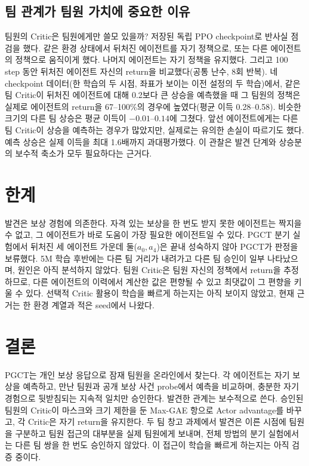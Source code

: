 \documentclass[10pt,twocolumn,letterpaper]{article}
\begin{document}
\subsection{팀 관계가 팀원 가치에 중요한 이유}
팀원의 Critic은 팀원에게만 쓸모 있을까? 저장된 독립 PPO checkpoint로 반사실 점검을 했다. 같은 환경 상태에서 뒤처진 에이전트를 자기 정책으로, 또는 다른 에이전트의 정책으로 움직이게 했다. 나머지 에이전트는 자기 정책을 유지했다. 그리고 100 step 동안 뒤처진 에이전트 자신의 return을 비교했다(공통 난수, 8회 반복). 네 checkpoint 데이터(한 학습의 두 시점, 좌표가 보이는 이전 설정의 두 학습)에서, 같은 팀 Critic이 뒤처진 에이전트에 대해 0.2보다 큰 상승을 예측했을 때 그 팀원의 정책은 실제로 에이전트의 return을 67--100\%의 경우에 높였다(평균 이득 0.28--0.58). 비슷한 크기의 다른 팀 상승은 평균 이득이 $-0.01$--$0.14$에 그쳤다. 앞선 에이전트에게는 다른 팀 Critic이 상승을 예측하는 경우가 많았지만, 실제로는 유의한 손실이 따르기도 했다. 예측 상승은 실제 이득을 최대 1.6배까지 과대평가했다. 이 관찰은 발견 단계와 상승분의 보수적 축소가 모두 필요하다는 근거다.

\section{한계}
발견은 보상 경험에 의존한다. 자격 있는 보상을 한 번도 받지 못한 에이전트는 짝지을 수 없고, 그 에이전트가 바로 도움이 가장 필요한 에이전트일 수 있다. PGCT 분기 실험에서 뒤처진 세 에이전트 가운데 둘($a_0,a_4$)은 끝내 성숙하지 않아 PGCT가 판정을 보류했다. 5M 학습 후반에는 다른 팀 거리가 내려가고 다른 팀 승인이 일부 나타났으며, 원인은 아직 분석하지 않았다. 팀원 Critic은 팀원 자신의 정책에서 return을 추정하므로, 다른 에이전트의 이력에서 계산한 값은 편향될 수 있고 최댓값이 그 편향을 키울 수 있다. 선택적 Critic 활용이 학습을 빠르게 하는지는 아직 보이지 않았고, 현재 근거는 한 환경 계열과 적은 seed에서 나왔다.

\section{결론}
PGCT는 개인 보상 응답으로 잠재 팀원을 온라인에서 찾는다. 각 에이전트는 자기 보상을 예측하고, 만난 팀원과 공개 보상 사건 probe에서 예측을 비교하며, 충분한 자기 경험으로 뒷받침되는 지속적 일치만 승인한다. 발견한 관계는 보수적으로 쓴다. 승인된 팀원의 Critic이 마스크와 크기 제한을 둔 Max-GAE 항으로 Actor advantage를 바꾸고, 각 Critic은 자기 return을 유지한다. 두 팀 창고 과제에서 발견은 이른 시점에 팀원을 구분하고 팀원 접근의 대부분을 실제 팀원에게 보내며, 전체 방법의 분기 실험에서는 다른 팀 쌍을 한 번도 승인하지 않았다. 이 접근이 학습을 빠르게 하는지는 아직 검증 중이다.
\end{document}
